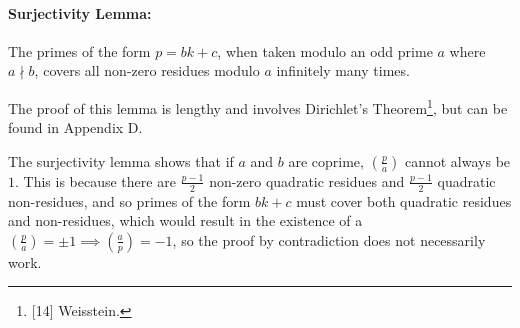 \documentclass{article}
\newcommand{\Z}{\mathbb{Z}}
\newcommand{\qrn}[2]{\left( \frac{#1}{#2}\right)}
\begin{document}
\paragraph{Surjectivity Lemma:} The primes of the form $p=bk+c$, when taken modulo an odd prime $a$ where $a \nmid b$, covers all non-zero residues modulo $a$ infinitely many times.

The proof of this lemma is lengthy and involves Dirichlet's Theorem\footnote{[14] Weisstein.}, but can be found in Appendix D.

The surjectivity lemma shows that if $a$ and $b$ are coprime, $\qrn{p}{a}$ cannot always be $1$. This is because there are $\frac{p-1}{2}$ non-zero quadratic residues and $\frac{p-1}{2}$ quadratic non-residues, and so primes of the form $bk+c$ must cover both quadratic residues and non-residues, which would result in the existence of a $\qrn{p}{a}=\pm 1 \implies \qrn{a}{p}=-1$, so the proof by contradiction does not necessarily work.
\end{document}
